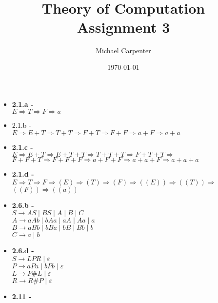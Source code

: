 \documentclass{article}
\title{Theory of Computation \\ Assignment 3}
\author{Michael Carpenter}
\date{\today}
\begin{document}
\maketitle

\begin{itemize}
  \item \textbf{2.1.a -} \\
    $E \Rightarrow T \Rightarrow F \Rightarrow a$
  \item 2.1.b - \\
    $E \Rightarrow E + T \Rightarrow T + T \Rightarrow F + T \Rightarrow F + F \Rightarrow a + F \Rightarrow a + a$
  \item \textbf{2.1.c -} \\
    $E \Rightarrow E + T \Rightarrow E + T + T \Rightarrow T + T + T \Rightarrow F + T + T \Rightarrow$ \\
    $F + F + T \Rightarrow F + F + F \Rightarrow a + F + F \Rightarrow a + a + F \Rightarrow a + a + a$ \\
  \item \textbf{2.1.d -} \\
    $E \Rightarrow T \Rightarrow F \Rightarrow (E) \Rightarrow (T) \Rightarrow (F) \Rightarrow ((E)) \Rightarrow ((T)) \Rightarrow$ \\
    $((F)) \Rightarrow ((a))$
  \item \textbf{2.6.b -} \\
    $S \to AS \mid BS \mid A \mid B \mid C$ \\
    $A \to aAb \mid bAa \mid aA \mid Aa \mid a$ \\
    $B \to aBb \mid bBa \mid bB \mid Bb \mid b$ \\
    $C \to a \mid b$ \\
  \item \textbf{2.6.d -} \\
    $S \to LPR \mid \varepsilon$ \\
    $P \to aPa \mid bPb \mid \varepsilon$ \\
    $L \to P\#L \mid \varepsilon$ \\ 
    $R \to R\#P \mid \varepsilon$ \\
  \item \textbf{2.11 -}
\end{itemize}
\end{document}
